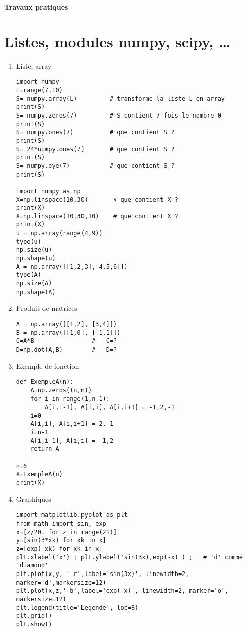 \documentclass[12pt]{article}
\begin{document}
\newif\ifcorrige  
\corrigetrue%
\corrigefalse
 

\centerline{\Huge \bf   Travaux pratiques} 
 
\section{Listes, modules numpy, scipy, \ldots}
\begin{enumerate}
 \item  Liste, array
 
\begin{lstlisting}
import numpy  
L=range(7,10)
S= numpy.array(L)         # transforme la liste L en array
print(S)
S= numpy.zeros(7)         # S contient 7 fois le nombre 0
print(S)
S= numpy.ones(7)          # que contient S ?
print(S)
S= 24*numpy.ones(7)       # que contient S ?
print(S)
S= numpy.eye(7)           # que contient S ?   
print(S) 

import numpy as np
X=np.linspace(10,30)       # que contient X ?   
print(X)
X=np.linspace(10,30,10)    # que contient X ?  
print(X)
u = np.array(range(4,9))
type(u)
np.size(u)
np.shape(u) 
A = np.array([[1,2,3],[4,5,6]])
type(A)
np.size(A)
np.shape(A)
\end{lstlisting} 

 \item Produit de matrices 
 
\begin{lstlisting}
A = np.array([[1,2], [3,4]])
B = np.array([[1,0], [-1,1]])
C=A*B                #   C=?
D=np.dot(A,B)        #   D=?
\end{lstlisting} 

 \item  Exemple de fonction 
 
\begin{lstlisting} 
def ExempleA(n):
    A=np.zeros((n,n))
    for i in range(1,n-1):
        A[i,i-1], A[i,i], A[i,i+1] = -1,2,-1
    i=0
    A[i,i], A[i,i+1] = 2,-1
    i=n-1
    A[i,i-1], A[i,i] = -1,2
    return A 

n=6
X=ExempleA(n)
print(X)
\end{lstlisting} 

 \item Graphiques
 
\begin{lstlisting}
import matplotlib.pyplot as plt
from math import sin, exp
x=[z/20. for z in range(21)]
y=[sin(3*xk) for xk in x]  
z=[exp(-xk) for xk in x]  
plt.xlabel('x') ; plt.ylabel('sin(3x),exp(-x)') ;   # 'd' comme 'diamond'
plt.plot(x,y, '-r',label='sin(3x)', linewidth=2, marker='d',markersize=12)
plt.plot(x,z,'-b',label='exp(-x)', linewidth=2, marker='o', markersize=12)
plt.legend(title='Legende', loc=8)
plt.grid()
plt.show() 
\end{lstlisting}


\end{enumerate}
\end{document}
